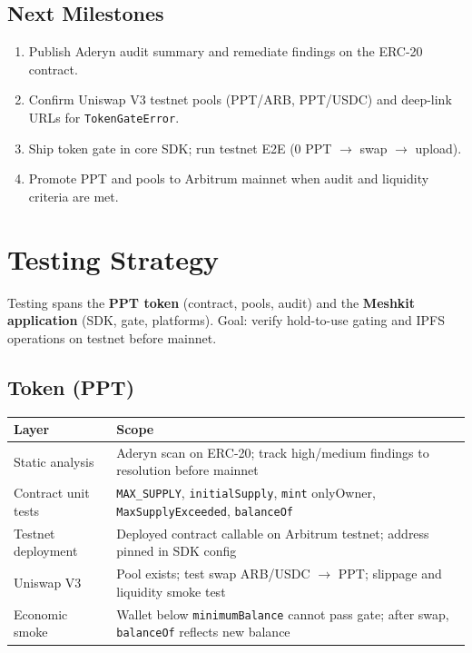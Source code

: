 \documentclass[11pt,a4paper,openany]{report}
\begin{document}
\section{Next Milestones}

\begin{enumerate}[leftmargin=*]
  \item Publish Aderyn audit summary and remediate findings on the ERC-20 contract.
  \item Confirm Uniswap V3 testnet pools (PPT/ARB, PPT/USDC) and deep-link URLs for \texttt{TokenGateError}.
  \item Ship token gate in core SDK; run testnet E2E (0 PPT $\rightarrow$ swap $\rightarrow$ upload).
  \item Promote PPT and pools to Arbitrum mainnet when audit and liquidity criteria are met.
\end{enumerate}

\chapter{Testing Strategy}

Testing spans the \textbf{PPT token} (contract, pools, audit) and the \textbf{Meshkit application} (SDK, gate, platforms). Goal: verify hold-to-use gating and IPFS operations on testnet before mainnet.

\section{Token (PPT)}

\begin{center}
\small
\begin{tabular}{@{}lp{9.5cm}@{}}
\toprule
\textbf{Layer} & \textbf{Scope} \\
\midrule
Static analysis & Aderyn scan on ERC-20; track high/medium findings to resolution before mainnet \\
Contract unit tests & \texttt{MAX\_SUPPLY}, \texttt{initialSupply}, \texttt{mint} onlyOwner, \texttt{MaxSupplyExceeded}, \texttt{balanceOf} \\
Testnet deployment & Deployed contract callable on Arbitrum testnet; address pinned in SDK config \\
Uniswap V3 & Pool exists; test swap ARB/USDC $\rightarrow$ PPT; slippage and liquidity smoke test \\
Economic smoke & Wallet below \texttt{minimumBalance} cannot pass gate; after swap, \texttt{balanceOf} reflects new balance \\
\bottomrule
\end{tabular}
\end{center}
\end{document}
